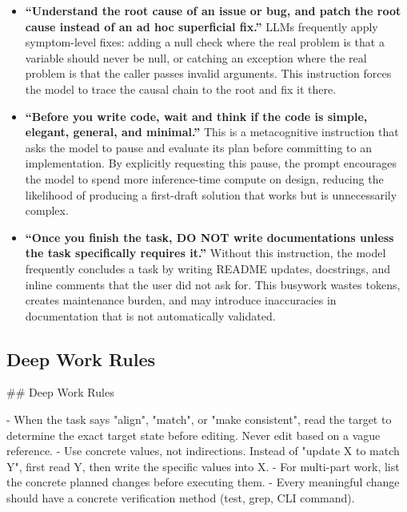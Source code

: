 \documentclass{article}
\begin{document}
\begin{itemize}[nosep]
\item \textbf{``Understand the root cause of an issue or bug, and
  patch the root cause instead of an ad hoc superficial fix.''}  LLMs
  frequently apply symptom-level fixes: adding a null check where the
  real problem is that a variable should never be null, or catching an
  exception where the real problem is that the caller passes invalid
  arguments.  This instruction forces the model to trace the causal
  chain to the root and fix it there.

\item \textbf{``Before you write code, wait and think if the code is
  simple, elegant, general, and minimal.''}  This is a metacognitive
  instruction that asks the model to pause and evaluate its plan
  before committing to an implementation.  By explicitly requesting
  this pause, the prompt encourages the model to spend more
  inference-time compute on design, reducing the likelihood of
  producing a first-draft solution that works but is unnecessarily
  complex.

\item \textbf{``Once you finish the task, DO NOT write documentations
  unless the task specifically requires it.''}  Without this
  instruction, the model frequently concludes a task by writing README
  updates, docstrings, and inline comments that the user did not ask
  for.  This busywork wastes tokens, creates maintenance burden, and
  may introduce inaccuracies in documentation that is not
  automatically validated.
\end{itemize}

\subsection{Deep Work Rules}

\begin{prompt}
## Deep Work Rules

- When the task says "align", "match", or "make
  consistent", read the target to determine the exact
  target state before editing. Never edit based on a vague
  reference.
- Use concrete values, not indirections. Instead of "update
  X to match Y", first read Y, then write the specific
  values into X.
- For multi-part work, list the concrete planned changes
  before executing them.
- Every meaningful change should have a concrete
  verification method (test, grep, CLI command).
\end{prompt}
\end{document}
